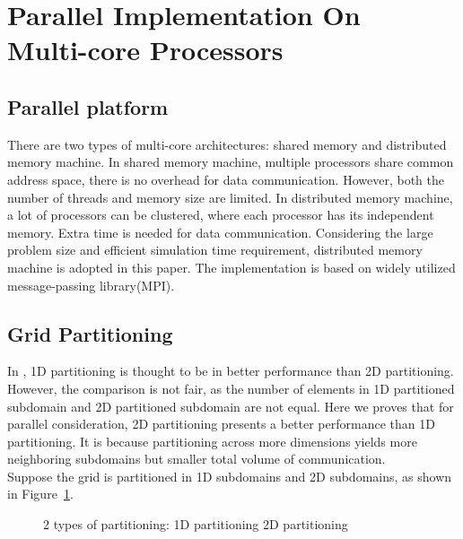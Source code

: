 \documentclass{sig-alternate}
\begin{document}
\section{Parallel Implementation On \\Multi-core Processors}
  \subsection{Parallel platform}
	There are two types of multi-core architectures: shared memory and distributed memory machine. In shared memory machine, 
	multiple processors share common address space, there is no overhead for data communication. However, both the number
	of threads and memory size are limited. In distributed 
	memory machine, a lot of processors can be clustered, where each processor has its independent memory. Extra time 
	is needed for data communication. Considering the large problem 
	size and efficient simulation time requirement, distributed memory machine is adopted in this paper. The implementation is based
	on widely utilized message-passing library(MPI).
  \subsection{Grid Partitioning}
	In \cite{Zhongyu}, 1D partitioning is thought to be in better performance than 2D partitioning. However, the comparison is not 
	fair, as the number of elements in 1D partitioned subdomain and 2D partitioned subdomain are not equal. Here we proves that
	for parallel consideration, 2D partitioning presents a better performance than 1D partitioning. It is because 
	partitioning across more dimensions yields more neighboring subdomains but smaller total volume of communication.\\

	Suppose the grid is partitioned in 1D subdomains and 2D subdomains, as shown in Figure~\ref{Fig3}.
	\begin{figure}[htbp]
	  \caption{2 types of partitioning:
	   1D partitioning
	   2D partitioning }
	  \label{Fig3}
	\end{figure}
\end{document}
